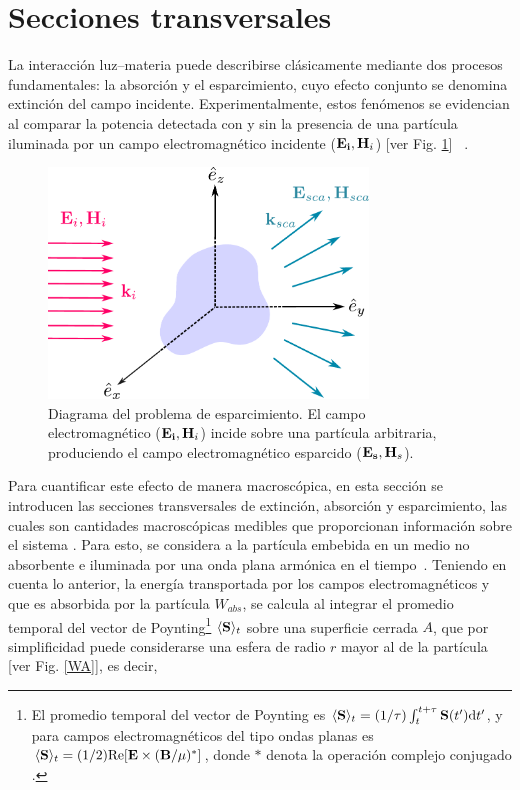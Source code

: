 

\section{Secciones transversales}
\label{section:yth}
La interacción luz–materia puede describirse clásicamente mediante dos procesos fundamentales: la absorción y el esparcimiento, cuyo efecto conjunto se denomina extinción del campo incidente. Experimentalmente, estos fenómenos se evidencian al comparar la potencia detectada con y sin la presencia de una partícula iluminada por un campo electromagnético incidente  ($\vb{E_i}, \vb{H}_i$) [ver Fig. \ref{scattering}] ~\cite{bohrenAbsorptionScatteringLight2008}.
%
\begin{figure}[h]
	\centering
	\includegraphics[width=8.5cm]{../../Figuras/scattering.pdf}
	\caption{Diagrama del problema de esparcimiento. El campo electromagnético ($\vb{E_i}, \vb{H}_i$) incide sobre una partícula arbitraria, produciendo el campo electromagnético esparcido ($\vb{E_s}, \vb{H}_s$).}
	\label{scattering}
\end{figure}
%
Para cuantificar este efecto de manera macroscópica, en esta sección se introducen las secciones transversales de extinción, absorción y esparcimiento, las cuales son cantidades macroscópicas medibles que proporcionan información sobre el sistema \cite{bohrenAbsorptionScatteringLight2008}. Para esto, se considera a la partícula embebida en un medio no absorbente e iluminada por una onda plana armónica en el tiempo~\cite{bohrenAbsorptionScatteringLight2008}. Teniendo en cuenta lo anterior, la energía transportada por los campos electromagnéticos y que es absorbida por la partícula $W_{abs}$, se calcula al integrar el promedio temporal del vector de Poynting\footnote{El promedio temporal del vector de Poynting es $\langle\vb{S}\rangle_t = (1/\tau)\int_t^{t+\tau}\vb{S}(t')\text{d}t'$, y para campos electromagnéticos del tipo ondas planas es $\langle\vb{S}\rangle_t = (1/2) \text{Re}[\vb{E} \times (\vb{B}/\mu)^{*}]$, donde $*$ denota la operación complejo conjugado \cite{bohrenAbsorptionScatteringLight2008}. } $\langle\vb{S}\rangle_t$  sobre una superficie cerrada $A$, que por simplificidad puede considerarse una esfera de radio $r$ mayor al de la partícula [ver Fig. \ref{WA}], es decir, 
